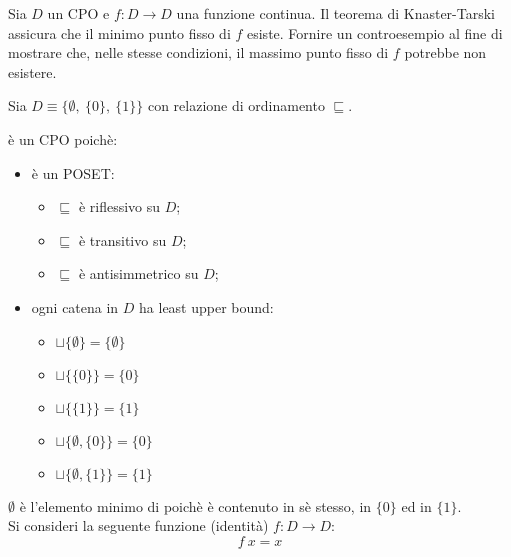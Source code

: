 \newcommand{\lt}{\ensuremath{\sqsubseteq}}

{
  Sia $D$ un CPO e $f: D \to D$ una funzione continua. Il teorema di
  Knaster-Tarski assicura che il minimo punto fisso di $f$ esiste.
  Fornire un controesempio al fine di mostrare che, nelle stesse condizioni, il
  massimo punto fisso di $f$ potrebbe non esistere.
}
{
}

Sia $D \equiv \{\emptyset,\ \{0\},\ \{1\}\}$ con relazione di ordinamento
$\sqsubseteq$.

 è un CPO poichè:
\begin{itemize}
  \item {} è un POSET:
  \begin{itemize}
    \item $\sqsubseteq$ è riflessivo su $D$;
    \item $\sqsubseteq$ è transitivo su $D$;
    \item $\sqsubseteq$ è antisimmetrico su $D$;
  \end{itemize}
  \item ogni catena in $D$ ha least upper bound:
  \begin{itemize}
    \item $\sqcup\{\emptyset\} = \{\emptyset\}$
    \item $\sqcup\{\{0\}\} = \{0\}$
    \item $\sqcup\{\{1\}\} = \{1\}$
    \item $\sqcup\{\emptyset, \{0\}\} = \{0\}$
    \item $\sqcup\{\emptyset, \{1\}\} = \{1\}$
  \end{itemize}
\end{itemize}

$\emptyset$ è l'elemento minimo di  poichè
è contenuto in sè stesso, in $\{0\}$ ed in $\{1\}$.
\\
Si consideri la seguente funzione (identità) $f: D \to D$:
$$
f\ x = x
$$

